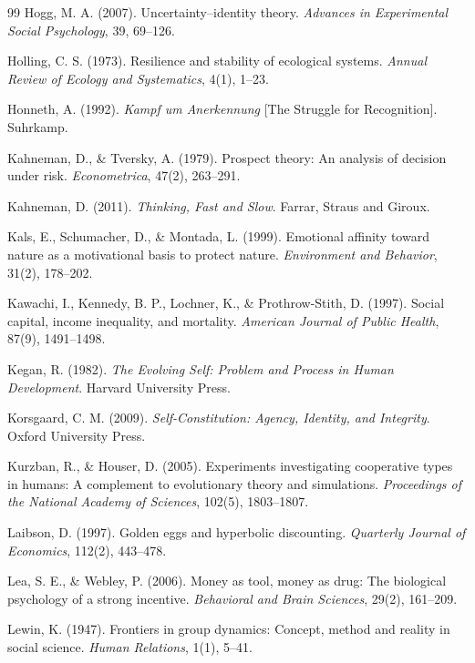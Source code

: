 \begin{thebibliography}{99}
Hogg, M. A. (2007).
Uncertainty–identity theory.
\textit{Advances in Experimental Social Psychology}, 39, 69--126.

Holling, C. S. (1973).
Resilience and stability of ecological systems.
\textit{Annual Review of Ecology and Systematics}, 4(1), 1--23.

Honneth, A. (1992).
\textit{Kampf um Anerkennung} [The Struggle for Recognition].
Suhrkamp.

Kahneman, D., \& Tversky, A. (1979).
Prospect theory: An analysis of decision under risk.
\textit{Econometrica}, 47(2), 263--291.

Kahneman, D. (2011).
\textit{Thinking, Fast and Slow}.
Farrar, Straus and Giroux.

Kals, E., Schumacher, D., \& Montada, L. (1999).
Emotional affinity toward nature as a motivational basis to protect nature.
\textit{Environment and Behavior}, 31(2), 178--202.

Kawachi, I., Kennedy, B. P., Lochner, K., \& Prothrow-Stith, D. (1997).
Social capital, income inequality, and mortality.
\textit{American Journal of Public Health}, 87(9), 1491--1498.

Kegan, R. (1982).
\textit{The Evolving Self: Problem and Process in Human Development}.
Harvard University Press.

Korsgaard, C. M. (2009).
\textit{Self-Constitution: Agency, Identity, and Integrity}.
Oxford University Press.

Kurzban, R., \& Houser, D. (2005).
Experiments investigating cooperative types in humans: A complement to evolutionary theory and simulations.
\textit{Proceedings of the National Academy of Sciences}, 102(5), 1803--1807.

Laibson, D. (1997).
Golden eggs and hyperbolic discounting.
\textit{Quarterly Journal of Economics}, 112(2), 443--478.

Lea, S. E., \& Webley, P. (2006).
Money as tool, money as drug: The biological psychology of a strong incentive.
\textit{Behavioral and Brain Sciences}, 29(2), 161--209.

Lewin, K. (1947).
Frontiers in group dynamics: Concept, method and reality in social science.
\textit{Human Relations}, 1(1), 5--41.


\end{thebibliography}
